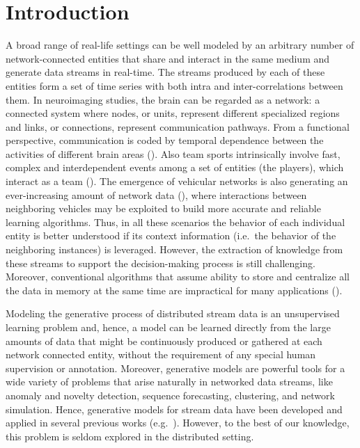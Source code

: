 \section{Introduction}
\label{sec:chp2_intro}
A broad range of real-life settings can be well modeled by an arbitrary number of network-connected entities that share and interact in the same medium and generate data streams in real-time. The streams produced by each of these entities form a set of time series with both intra and inter-correlations between them. In neuroimaging studies, the brain can be regarded as a network: a connected system where nodes, or units, represent different specialized regions and links, or connections, represent communication pathways. From a functional perspective, communication is coded by temporal dependence between the activities of different brain areas (\citet{DeVicoFallani20130521}). Also team sports intrinsically involve fast, complex and interdependent events among a set of entities (the players), which interact as a team (\citet{Tora2017, Theagarajan2018}). The emergence of vehicular networks is also generating an ever-increasing amount of network data (\citet{Cheng2018}), where interactions between neighboring vehicles may be exploited to build more accurate and reliable learning algorithms. Thus, in all these scenarios the behavior of each individual entity is better understood if its context information (i.e.\ the behavior of the neighboring instances) is leveraged. However, the extraction of knowledge from these streams to support the decision-making process is still challenging. Moreover, conventional algorithms that assume ability to store and centralize all the data in memory at the same time are impractical for many applications (\citet{Gama2007}).

Modeling the generative process of distributed stream data is an unsupervised learning problem and, hence, a model can be learned directly from the large amounts of data that might be continuously produced or gathered at each network connected entity, without the requirement of any special human supervision or annotation. Moreover, generative models are powerful tools for a wide variety of problems that arise naturally in networked data streams, like anomaly and novelty detection, sequence forecasting, clustering, and network simulation. Hence, generative models for stream data have been developed and applied in several previous works (e.g.\ \citet{Laxman2008, Hayat2010, Hofmann2011}). However, to the best of our knowledge, this problem is seldom explored in the  distributed setting.

